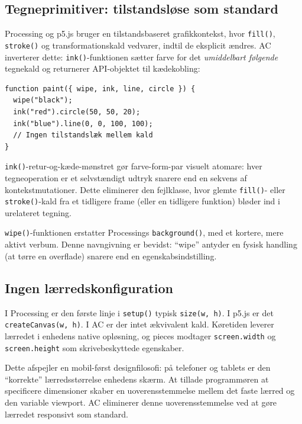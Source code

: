 \documentclass[10pt,letterpaper,twocolumn]{article}
\begin{document}
\subsection{Tegneprimitiver: tilstandsløse som standard}

Processing og p5.js bruger en tilstandsbaseret grafikkontekst, hvor \texttt{fill()}, \texttt{stroke()} og transformationskald vedvarer, indtil de eksplicit ændres. AC inverterer dette: \texttt{ink()}-funktionen sætter farve for det \emph{umiddelbart følgende} tegnekald og returnerer API-objektet til kædekobling:

\begin{lstlisting}[style=acjsstyle]
function paint({ wipe, ink, line, circle }) {
  wipe("black");
  ink("red").circle(50, 50, 20);
  ink("blue").line(0, 0, 100, 100);
  // Ingen tilstandslæk mellem kald
}
\end{lstlisting}

\texttt{ink()}-retur-og-kæde-mønstret gør farve-form-par visuelt atomare: hver tegneoperation er et selvstændigt udtryk snarere end en sekvens af kontekstmutationer. Dette eliminerer den fejlklasse, hvor glemte \texttt{fill()}- eller \texttt{stroke()}-kald fra et tidligere frame (eller en tidligere funktion) bløder ind i urelateret tegning.

\texttt{wipe()}-funktionen erstatter Processings \texttt{background()}, med et kortere, mere aktivt verbum. Denne navngivning er bevidst: ``wipe'' antyder en fysisk handling (at tørre en overflade) snarere end en egenskabsindstilling.

\subsection{Ingen lærredskonfiguration}

I Processing er den første linje i \texttt{setup()} typisk \texttt{size(w, h)}. I p5.js er det \texttt{createCanvas(w, h)}. I AC er der intet ækvivalent kald. Køretiden leverer lærredet i enhedens native opløsning, og pieces modtager \texttt{screen.width} og \texttt{screen.height} som skrivebeskyttede egenskaber.

Dette afspejler en mobil-først designfilosofi: på telefoner og tablets er den ``korrekte'' lærredsstørrelse enhedens skærm. At tillade programmøren at specificere dimensioner skaber en uoverensstemmelse mellem det faste lærred og den variable viewport. AC eliminerer denne uoverensstemmelse ved at gøre lærredet responsivt som standard.

\end{document}
